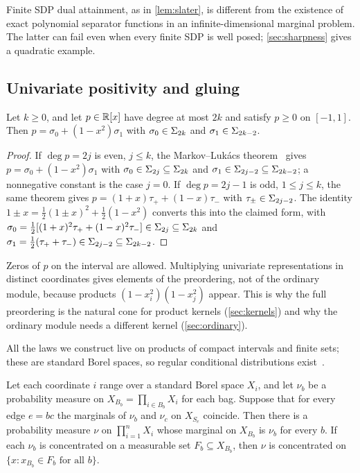 Finite SDP dual attainment, as in \cref{lem:slater}, is different from the
existence of exact polynomial separator functions in an infinite-dimensional
marginal problem. The latter can fail even when every finite SDP is well
posed; \cref{sec:sharpness} gives a quadratic example.

\subsection{Univariate positivity and gluing}\label{sec:set-tools}

\begin{lemma}\label{lem:interval-sos}
Let $k\ge0$, and let $p\in\mathbb{R}[x]$ have degree at most $2k$ and satisfy
$p\ge0$ on $[-1,1]$.
Then $p=\sigma_0+(1-x^2)\sigma_1$ with $\sigma_0\in\Sigma_{2k}$ and
$\sigma_1\in\Sigma_{2k-2}$.
\end{lemma}

\begin{proof}
If $\deg p=2j$ is even, $j\le k$, the Markov--Lukács
theorem~\cite{powers2000-univariate-interval} gives
$p=\sigma_0+(1-x^2)\sigma_1$ with $\sigma_0\in\Sigma_{2j}\subseteq\Sigma_{2k}$
and $\sigma_1\in\Sigma_{2j-2}\subseteq\Sigma_{2k-2}$; a nonnegative constant is
the case $j=0$. If $\deg p=2j-1$ is odd, $1\le j\le k$, the same theorem
gives $p=(1+x)\tau_+ +(1-x)\tau_-$ with $\tau_\pm\in\Sigma_{2j-2}$. The
identity $1\pm x=\tfrac12(1\pm x)^2+\tfrac12(1-x^2)$ converts this into
the claimed form, with $\sigma_0=\tfrac12[(1+x)^2\tau_++(1-x)^2\tau_-]\in
\Sigma_{2j}\subseteq\Sigma_{2k}$ and
$\sigma_1=\tfrac12(\tau_++\tau_-)\in\Sigma_{2j-2}\subseteq\Sigma_{2k-2}$.
\end{proof}

Zeros of $p$ on the interval are allowed. Multiplying univariate
representations in distinct coordinates gives elements of the preordering,
not of the ordinary module, because products
$(1-x_i^2)(1-x_j^2)$ appear. This is why the full preordering is the
natural cone for product kernels (\cref{sec:kernels}) and why the ordinary
module needs a different kernel (\cref{sec:ordinary}).

All the laws we construct live on products of compact intervals and finite
sets; these are standard Borel spaces, so regular conditional
distributions exist~\cite{kallenberg2002-foundations}.

\begin{lemma}\label{lem:gluing}
Let each coordinate $i$ range over a standard Borel space $X_i$, and let
$\nu_b$ be a probability measure on $X_{B_b}=\prod_{i\in B_b}X_i$ for each
bag. Suppose that for every edge $e=bc$ the marginals of $\nu_b$ and $\nu_c$
on $X_{S_e}$ coincide. Then there is a probability measure $\nu$ on
$\prod_{i=1}^nX_i$ whose marginal on $X_{B_b}$ is $\nu_b$ for every $b$. If
each $\nu_b$ is concentrated on a measurable set $F_b\subseteq X_{B_b}$, then
$\nu$ is concentrated on $\{x:x_{B_b}\in F_b\text{ for all }b\}$.
\end{lemma}

